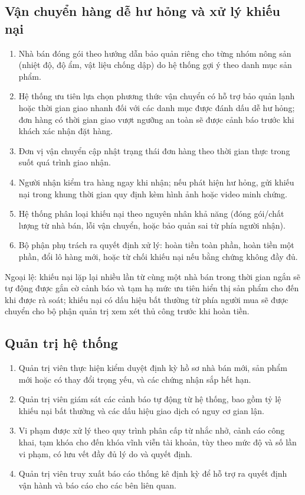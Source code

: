 

\subsection{Vận chuyển hàng dễ hư hỏng và xử lý khiếu nại}

\begin{enumerate}
    \item Nhà bán đóng gói theo hướng dẫn bảo quản riêng cho từng nhóm nông sản (nhiệt độ, độ ẩm, vật liệu chống dập) do hệ thống gợi ý theo danh mục sản phẩm.
    \item Hệ thống ưu tiên lựa chọn phương thức vận chuyển có hỗ trợ bảo quản lạnh hoặc thời gian giao nhanh đối với các danh mục được đánh dấu dễ hư hỏng; đơn hàng có thời gian giao vượt ngưỡng an toàn sẽ được cảnh báo trước khi khách xác nhận đặt hàng.
    \item Đơn vị vận chuyển cập nhật trạng thái đơn hàng theo thời gian thực trong suốt quá trình giao nhận.
    \item Người nhận kiểm tra hàng ngay khi nhận; nếu phát hiện hư hỏng, gửi khiếu nại trong khung thời gian quy định kèm hình ảnh hoặc video minh chứng.
    \item Hệ thống phân loại khiếu nại theo nguyên nhân khả năng (đóng gói/chất lượng từ nhà bán, lỗi vận chuyển, hoặc bảo quản sai từ phía người nhận).
    \item Bộ phận phụ trách ra quyết định xử lý: hoàn tiền toàn phần, hoàn tiền một phần, đổi lô hàng mới, hoặc từ chối khiếu nại nếu bằng chứng không đầy đủ.
\end{enumerate}

Ngoại lệ: khiếu nại lặp lại nhiều lần từ cùng một nhà bán trong thời gian ngắn sẽ tự động được gắn cờ cảnh báo và tạm hạ mức ưu tiên hiển thị sản phẩm cho đến khi được rà soát; khiếu nại có dấu hiệu bất thường từ phía người mua sẽ được chuyển cho bộ phận quản trị xem xét thủ công trước khi hoàn tiền.



\subsection{Quản trị hệ thống}

\begin{enumerate}
    \item Quản trị viên thực hiện kiểm duyệt định kỳ hồ sơ nhà bán mới, sản phẩm mới hoặc có thay đổi trọng yếu, và các chứng nhận sắp hết hạn.
    \item Quản trị viên giám sát các cảnh báo tự động từ hệ thống, bao gồm tỷ lệ khiếu nại bất thường và các dấu hiệu giao dịch có nguy cơ gian lận.
    \item Vi phạm được xử lý theo quy trình phân cấp từ nhắc nhở, cảnh cáo công khai, tạm khóa cho đến khóa vĩnh viễn tài khoản, tùy theo mức độ và số lần vi phạm, có lưu vết đầy đủ lý do và quyết định.
    \item Quản trị viên truy xuất báo cáo thống kê định kỳ để hỗ trợ ra quyết định vận hành và báo cáo cho các bên liên quan.
\end{enumerate}

